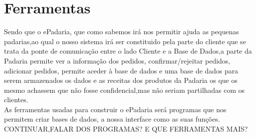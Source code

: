\section{Ferramentas}
Sendo que o ePadaria, que como sabemos irá nos permitir ajuda as pequenas padarias,ao qual o nosso sistema irá ser constituido pela parte do cliente que se trata da ponte de comunicação entre o lado Cliente e a Base de Dados,a parte da Padaria permite ver a informação dos pedidos, confirmar/rejeitar pedidos, adicionar pedidos, permite aceder à base de dados e uma base de dados para serem armazenados os dados e as receitas dos produtos da Padaria os que os mesmo achassem que não fosse confidencial,mas não seriam partilhadas com os clientes.\\
As ferramentas usadas para construir o ePadaria será programas que nos permitem criar bases de dados, a nossa interface como as suas funções. 
CONTINUAR,FALAR DOS PROGRAMAS? E QUE FERRAMENTAS MAIS?